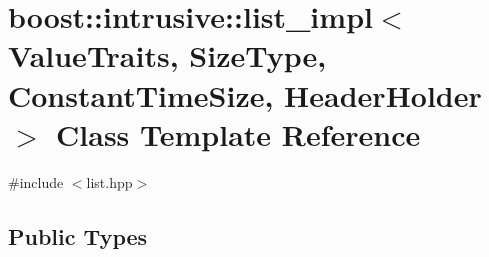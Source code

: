 \hypertarget{classboost_1_1intrusive_1_1list__impl}{}\section{boost\+:\+:intrusive\+:\+:list\+\_\+impl$<$ Value\+Traits, Size\+Type, Constant\+Time\+Size, Header\+Holder $>$ Class Template Reference}
\label{classboost_1_1intrusive_1_1list__impl}


{\ttfamily \#include $<$list.\+hpp$>$}

\subsection*{Public Types}
